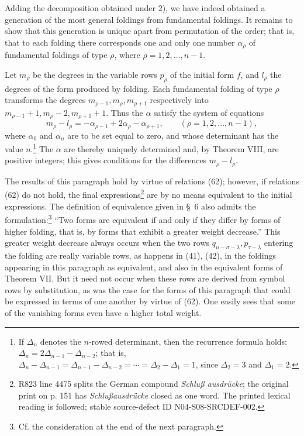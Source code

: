 \documentclass[10pt]{article}
\begin{document}
Adding the decomposition obtained under 2), we have indeed obtained a
generation of the most general foldings from fundamental foldings. It
remains to show that this generation is unique apart from permutation of
the order; that is, that to each folding there corresponds one and only one
number $\alpha_\rho$ of fundamental foldings of type $\rho$, where
$\rho=1,2,\ldots,n-1$.

Let $m_\rho$ be the degrees in the variable rows $p_\rho$ of the initial
form $f$, and $l_\rho$ the degrees of the form produced by folding. Each
fundamental folding of type $\rho$ transforms the degrees
$m_{\rho-1},m_\rho,m_{\rho+1}$ respectively into
$m_{\rho-1}+1,m_\rho-2,m_{\rho+1}+1$. Thus the $\alpha$ satisfy the system
of equations
\begin{equation}
 m_\rho-l_\rho=-\alpha_{\rho-1}+2\alpha_\rho-\alpha_{\rho+1},
 \qquad(\rho=1,2,\ldots,n-1),
\tag{70}
\end{equation}
where $\alpha_0$ and $\alpha_n$ are to be set equal to zero, and whose
determinant has the value $n$.\footnote{If $\Delta_n$ denotes the
$n$-rowed determinant, then the recurrence formula holds:
$\Delta_n=2\Delta_{n-1}-\Delta_{n-2}$; that is,
$\Delta_n-\Delta_{n-1}=\Delta_{n-1}-\Delta_{n-2}=\cdots
=\Delta_2-\Delta_1=1$, since $\Delta_2=3$ and $\Delta_1=2$.}
The $\alpha$ are thereby uniquely determined and, by Theorem VIII, are
positive integers; this gives conditions for the differences
$m_\rho-l_\rho$.

The results of this paragraph hold by virtue of relations (62); however, if
relations (62) do not hold, the final expressions\footnote{R823 line 4475
splits the German compound \emph{Schlu\ss{} ausdr\"ucke}; the original print
on p. 151 has \emph{Schlu\ss{}ausdr\"ucke} closed as one word. The printed
lexical reading is followed; stable source-defect ID
N04-S08-SRCDEF-002.} are by no means equivalent to the initial expressions.
The definition of equivalence given in \S\ 6 also admits the
formulation:\footnote{Cf. the consideration at the end of the next
paragraph.} ``Two forms are
equivalent if and only if they differ by forms of higher folding, that is,
by forms that exhibit a greater weight decrease.'' This greater weight
decrease always occurs when the two rows
$q_{n-\sigma-\lambda},p_{\tau-\lambda}$ entering the folding are really
variable rows, as happens in (41), (42), in the foldings appearing in this
paragraph as equivalent, and also in the equivalent forms of Theorem VII.
But it need not occur when these rows are derived from symbol rows by
substitution, as was the case for the forms of this paragraph that could be
expressed in terms of one another by virtue of (62). One easily sees that
some of the vanishing forms even have a higher total weight.
\end{document}
